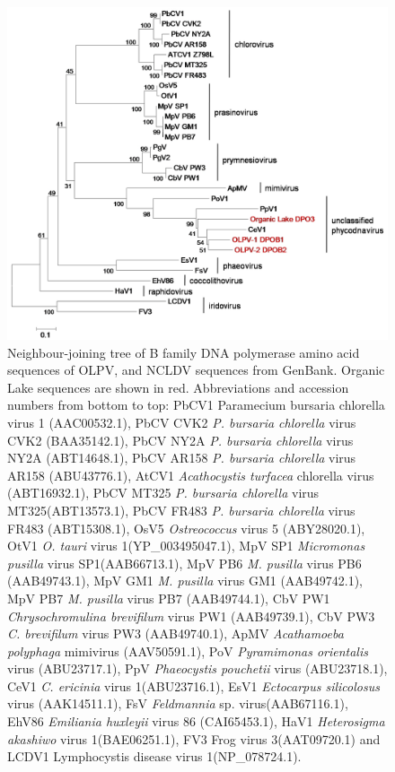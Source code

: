 \begin{figure}
\includegraphics[width=\textwidth]{olv_figures/OLPV_full_dpo.jpg}
\caption[Phylogeny of \ac{OLPV} using B family DNA polymerase sequences]{Neighbour-joining tree of B family DNA polymerase amino acid sequences of \ac{OLPV}, and \ac{NCLDV} sequences from GenBank. 
Organic Lake sequences are shown in red.
Abbreviations and accession numbers from bottom to top: PbCV1 Paramecium bursaria chlorella virus 1 (AAC00532.1), PbCV CVK2 \emph{P. bursaria chlorella} virus CVK2 (BAA35142.1), PbCV NY2A  \emph{P. bursaria chlorella} virus NY2A (ABT14648.1), PbCV AR158 \emph{P. bursaria chlorella} virus AR158 (ABU43776.1), AtCV1 \emph{Acathocystis turfacea} chlorella virus (ABT16932.1), PbCV MT325  \emph{P. bursaria chlorella} virus MT325(ABT13573.1), PbCV FR483 \emph{P. bursaria chlorella} virus FR483 (ABT15308.1), OsV5 \emph{Ostreococcus} virus 5 (ABY28020.1), OtV1 \emph{O. tauri} virus 1(YP\_003495047.1),  MpV SP1 \emph{Micromonas pusilla} virus SP1(AAB66713.1), MpV PB6 \emph{M. pusilla} virus PB6 (AAB49743.1), MpV GM1 \emph{M. pusilla} virus GM1 (AAB49742.1), MpV PB7 \emph{M. pusilla} virus PB7 (AAB49744.1), CbV PW1 \emph{Chrysochromulina brevifilum} virus PW1 (AAB49739.1), CbV PW3 \emph{C. brevifilum} virus PW3 (AAB49740.1), ApMV \emph{Acathamoeba polyphaga} mimivirus (AAV50591.1), PoV  \emph{Pyramimonas orientalis} virus (ABU23717.1), PpV \emph{Phaeocystis pouchetii} virus (ABU23718.1), CeV1 \emph{C. ericinia} virus 1(ABU23716.1), EsV1 \emph{Ectocarpus silicolosus} virus (AAK14511.1), FsV \emph{Feldmannia} sp. virus(AAB67116.1), EhV86 \emph{Emiliania huxleyii} virus 86 (CAI65453.1), HaV1 \emph{Heterosigma akashiwo} virus 1(BAE06251.1), FV3 Frog virus 3(AAT09720.1) and LCDV1 Lymphocystis disease virus 1(NP\_078724.1). 
}
\label{fig:OLPV_full_dpo}

\end{figure}
